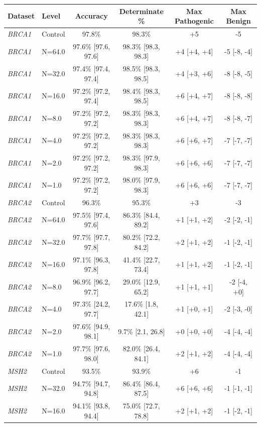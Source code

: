 \begin{tabular}{llcccc}
\toprule
Dataset & Level & Accuracy & Determinate \% & Max Pathogenic & Max Benign \\
\midrule
\textit{BRCA1} & Control & 97.8\% & 98.3\% & +5 & -5 \\
\textit{BRCA1} & N=64.0 & 97.6\% [97.6, 97.6] & 98.3\% [98.3, 98.3] & +4 [+4, +4] & -5 [-8, -4] \\
\textit{BRCA1} & N=32.0 & 97.4\% [97.4, 97.4] & 98.5\% [98.3, 98.5] & +4 [+3, +6] & -8 [-8, -5] \\
\textit{BRCA1} & N=16.0 & 97.2\% [97.2, 97.4] & 98.4\% [98.3, 98.5] & +6 [+4, +7] & -8 [-8, -8] \\
\textit{BRCA1} & N=8.0 & 97.2\% [97.2, 97.2] & 98.3\% [98.3, 98.3] & +6 [+4, +7] & -8 [-8, -7] \\
\textit{BRCA1} & N=4.0 & 97.2\% [97.2, 97.2] & 98.3\% [98.3, 98.3] & +6 [+6, +7] & -7 [-7, -7] \\
\textit{BRCA1} & N=2.0 & 97.2\% [97.2, 97.2] & 98.3\% [97.9, 98.3] & +6 [+6, +6] & -7 [-7, -7] \\
\textit{BRCA1} & N=1.0 & 97.2\% [97.2, 97.2] & 98.0\% [97.9, 98.3] & +6 [+6, +6] & -7 [-7, -7] \\
\midrule
\textit{BRCA2} & Control & 96.3\% & 95.3\% & +3 & -3 \\
\textit{BRCA2} & N=64.0 & 97.5\% [97.4, 97.6] & 86.3\% [84.4, 89.2] & +1 [+1, +2] & -2 [-2, -1] \\
\textit{BRCA2} & N=32.0 & 97.7\% [97.7, 97.8] & 80.2\% [72.2, 84.2] & +2 [+1, +2] & -1 [-2, -1] \\
\textit{BRCA2} & N=16.0 & 97.1\% [96.3, 97.8] & 41.4\% [22.7, 73.4] & +1 [+1, +2] & -1 [-2, -1] \\
\textit{BRCA2} & N=8.0 & 96.9\% [96.2, 97.7] & 29.0\% [12.9, 65.2] & +1 [+1, +1] & -2 [-4, +0] \\
\textit{BRCA2} & N=4.0 & 97.3\% [24.2, 97.7] & 17.6\% [1.8, 42.1] & +1 [+0, +1] & -2 [-3, -0] \\
\textit{BRCA2} & N=2.0 & 97.6\% [94.9, 98.1] & 9.7\% [2.1, 26.8] & +0 [+0, +0] & -4 [-4, -4] \\
\textit{BRCA2} & N=1.0 & 97.7\% [97.6, 98.0] & 82.0\% [26.4, 84.1] & +2 [+1, +2] & -4 [-4, -4] \\
\midrule
\textit{MSH2} & Control & 93.5\% & 93.9\% & +6 & -1 \\
\textit{MSH2} & N=32.0 & 94.7\% [94.7, 94.8] & 86.4\% [86.4, 87.5] & +6 [+6, +6] & -1 [-1, -1] \\
\textit{MSH2} & N=16.0 & 94.1\% [93.8, 94.4] & 75.0\% [72.7, 78.8] & +2 [+1, +2] & -1 [-2, -1] \\

\end{tabular}
